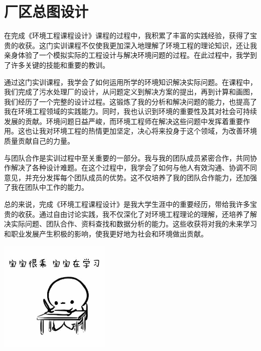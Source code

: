 \documentclass[hyperref,a4paper,cs4size,UTF8]{ctexart}                 %
\begin{document}
\section{厂区总图设计}
\begin{myconclusion} %
	在完成《环境工程课程设计》课程的过程中，我积累了丰富的实践经验，获得了宝贵的收获。这门实训课程不仅使我更加深入地理解了环境工程的理论知识，还让我亲身体验了一个模拟实际的工程设计与解决环境问题的过程。在此过程中，我学到了许多关键的技能和重要的教训。

	通过这门实训课程，我学会了如何运用所学的环境知识解决实际问题。在课程中，我们完成了污水处理厂的设计，从问题定义到解决方案的提出，再到计算和画图，我们经历了一个完整的设计过程。这锻炼了我的分析和解决问题的能力，也提高了我在环境工程领域的实践能力。同时，我也认识到环境的重要性及其对社会可持续发展的贡献。环境问题日益严峻，而环境工程师在解决这些问题中发挥着重要作用。这也让我对环境工程的热情更加坚定，决心将来投身于这个领域，为改善环境质量贡献自己的力量。
	
	与团队合作是实训过程中至关重要的一部分。我与我的团队成员紧密合作，共同协作解决了各种设计难题。在这个过程中，我学会了如何与他人有效沟通、协调不同意见，并充分发挥每个团队成员的优势。这不仅培养了我的团队合作能力，还加强了我在团队中工作的能力。

	总的来说，完成《环境工程课程设计》是我大学生涯中的重要经历，带给我许多宝贵的收获。通过自由讨论实践，我不仅深化了对环境工程理论的理解，还培养了解决实际问题、团队合作、资料查找和数据分析的能力。这些收获将对我的未来学习和职业发展产生积极的影响，使我更好地为社会和环境做出贡献。

	\vfill
	\begin{center}
		\includegraphics[width=0.4\textwidth]{school_badge/study.jpg}
	\end{center}

\end{myconclusion}
\end{document}
